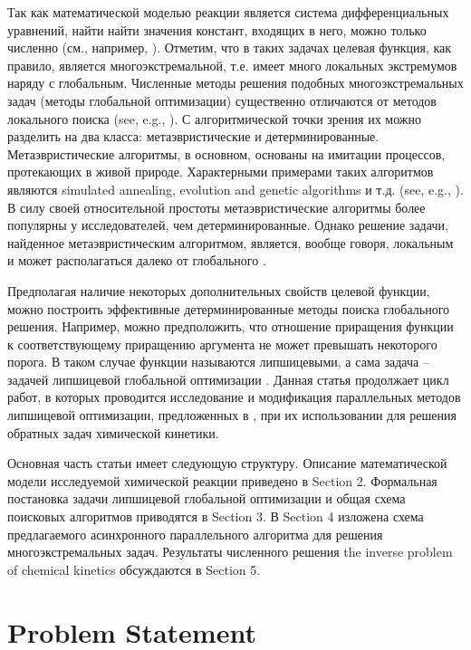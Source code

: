 \documentclass{svproc}
\begin{document}
Так как математической моделью реакции является система дифференциальных уравнений, найти найти значения констант, входящих в него, можно только численно (см., например, \cite{RSD}). Отметим, что в таких задачах целевая функция, как правило, является многоэкстремальной, т.е. имеет много локальных экстремумов наряду с глобальным. 
Численные методы решения подобных многоэкстремальных задач (методы глобальной оптимизации) существенно отличаются от методов локального поиска (see, e.g., \cite{Sergeyev2017,PaulaviciusZilinskas2014}).  
С алгоритмической точки зрения их можно разделить на два класса: метаэвристические и детерминированные. Метаэвристические алгоритмы, в основном, основаны на имитации процессов, протекающих в живой природе.
Характерными примерами таких алгоритмов являются simulated annealing, evolution and genetic algorithms и т.д. (see, e.g., \cite{Battiti2009,Eiben2015}). В силу своей относительной простоты метаэвристические алгоритмы более популярны у исследователей, чем детерминированные.  Однако решение задачи, найденное метаэвристическим алгоритмом, является, вообще говоря, локальным и может располагаться далеко от глобального \cite{Kvasov2018}. 

Предполагая наличие некоторых дополнительных свойств целевой функции, можно построить эффективные детерминированные методы поиска глобального решения.
Например, можно предположить, что отношение приращения функции к соответствующему приращению аргумента не может превышать некоторого порога. В таком случае функции называются липшицевыми, а сама задача -- задачей липшицевой глобальной оптимизации . 
Данная статья продолжает цикл работ, в которых проводится исследование и модификация параллельных методов липшицевой оптимизации, предложенных в \cite{Strongin2000}, при их использовании для решения обратных задач химической кинетики. 

Основная часть статьи имеет следующую структуру. Описание математической модели исследуемой химической реакции приведено в Section 2. Формальная постановка задачи липшицевой глобальной оптимизации и общая схема поисковых алгоритмов приводятся в Section 3. В Section 4 изложена схема предлагаемого асинхронного параллельного алгоритма для решения многоэкстремальных задач. Результаты численного решения the inverse problem of chemical kinetics обсуждаются в Section 5.


\section{Problem Statement}\label{Sec_math_mod}
\end{document}
